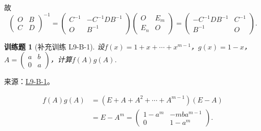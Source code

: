 \documentclass[12pt,fontset=fandol]{ctexart}
\newtheorem{exercise}{训练题}[section]
\begin{document}
\begin{solve}
\begin{enumerate}
                    故
                    \[
                        \begin{pmatrix}
                            O & B \\ C & D
                        \end{pmatrix}^{-1} = \begin{pmatrix}
                            C^{-1} & -C^{-1}DB^{-1} \\ O & B^{-1}
                        \end{pmatrix} \begin{pmatrix}
                            O & E_m \\ E_n & O
                        \end{pmatrix} = \begin{pmatrix}
                            -C^{-1}DB^{-1} & C^{-1} \\ B^{-1} & O
                        \end{pmatrix}.
                    \]

            \end{enumerate}
\end{solve}

\begin{exercise}[补充训练 L9-B-1]\label{prob:L9-B-1}
设$f(x)=1+x+\cdots+x^{m-1}$，$g(x)=1-x$，$A=\begin{pmatrix}
                a & b \\ 0 & a
            \end{pmatrix}$，计算$f(A)g(A)$.
\end{exercise}
\noindent 来源：\href{https://github.com/yhwu-is/Linear-Algebra-Left-Undone/blob/new/%E8%AE%B2%E4%B9%89/%E4%B8%93%E9%A2%98/9%20%E7%9F%A9%E9%98%B5%E8%BF%90%E7%AE%97%E8%BF%9B%E9%98%B6.tex}{L9-B-1}。
\begin{solve}
\begin{align*}
                f(A) g(A) & = (E + A + A^2 + \cdots + A^{m - 1})(E - A) \\
                          & = E - A^m = \begin{pmatrix}
                                            1 - a^m & -mba^{m - 1} \\
                                            0       & 1 - a^m
                                        \end{pmatrix}.
            \end{align*}
\end{solve}
\end{document}
